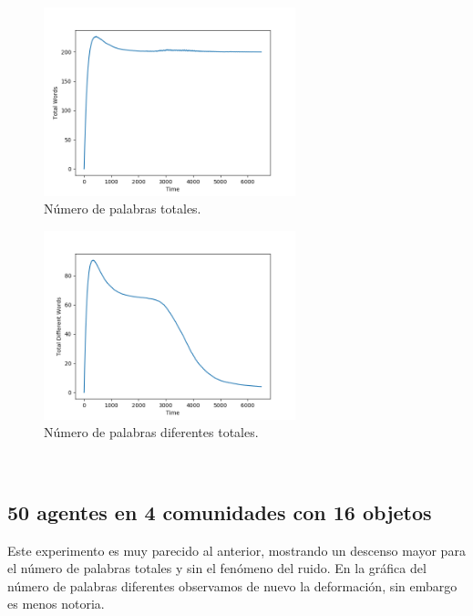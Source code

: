 \documentclass[runningheads]{llncs}
\begin{document}
\begin{figure}[H]
	\centering
	\includegraphics[width=0.65\textwidth]{Figure_113_TotalWords.png}
	\caption{Número de palabras totales.}
	\label{fig_002}
\end{figure}
\begin{figure}[H]
	\centering
	\includegraphics[width=0.65\textwidth]{Figure_113_TotalDifferentWords.png}
	\caption{Número de palabras diferentes totales.}
	\label{fig_003}
\end{figure}
\pagebreak
\\
\subsection{50 agentes en 4 comunidades con 16 objetos}

Este experimento es muy parecido al anterior, mostrando un descenso mayor para el número de palabras totales y sin el fenómeno del ruido. En la gráfica del número de palabras diferentes observamos de nuevo la deformación, sin embargo es menos notoria.
\end{document}

